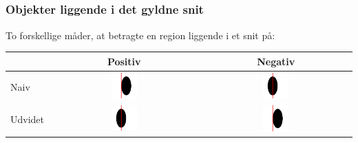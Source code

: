 \documentclass[xcolor=table]{beamer}
\begin{document}
\subsection*{}
\begin{frame}

    \frametitle{Objekter liggende i det gyldne snit}

    To forskellige måder, at betragte en region liggende i et snit på:

    \begin{center}
        \begin{tabular}{l|cc}
            & Positiv & Negativ\\\hline
            Naiv    & \includegraphics[width=0.18\textwidth]{pnaiv_nudvidet} & \includegraphics[width=0.18\textwidth]{pudvidet_nnaiv}\\
            Udvidet & \includegraphics[width=0.18\textwidth]{pudvidet_nnaiv} & \includegraphics[width=0.18\textwidth]{pnaiv_nudvidet}
        \end{tabular}
    \end{center}

\end{frame}
\end{document}
